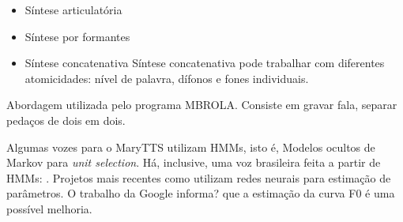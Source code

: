 \begin{itemize}
\item Síntese articulatória
\item Síntese por formantes
\item Síntese concatenativa
Síntese concatenativa pode trabalhar com diferentes atomicidades: nível de palavra,
dífonos e fones individuais.
\end{itemize}



Abordagem utilizada pelo programa MBROLA. Consiste em gravar fala, separar
pedaços de dois em dois.

Algumas vozes para o MaryTTS \cite{marytts} utilizam HMMs, isto é, Modelos
ocultos de Markov para \emph{unit selection}. Há, inclusive, uma voz brasileira
feita a partir de HMMs: \cite{couto}.
Projetos mais recentes como \cite{merlin,dnngoogle} utilizam redes neurais para
estimação de parâmetros. O trabalho da Google informa? que a estimação da curva
F0 é uma possível melhoria.
